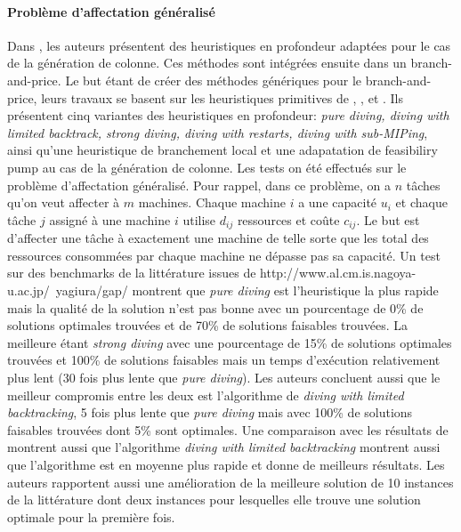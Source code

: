 \documentclass[12pt,a4paper,oneside]{book}
\theoremstyle{definition}
\begin{document}
	    
	    \paragraph{Problème d'affectation généralisé}
	        Dans \cite{sadykov2018primal}, les auteurs présentent des heuristiques en profondeur adaptées pour le cas de la génération de colonne. Ces méthodes sont intégrées ensuite dans un branch-and-price. Le but étant de créer des méthodes génériques pour le branch-and-price, leurs travaux se basent sur les heuristiques primitives de \cite{fischetti2003local}, \cite{Fischetti2005}, \cite{danna2005exploring} et \cite{berthold2006}.
	        Ils présentent cinq variantes des heuristiques en profondeur: \textit{pure diving, diving with limited backtrack, strong diving, diving with restarts, diving with sub-MIPing}, ainsi qu'une heuristique de branchement local et une adapatation de feasibiliry pump au cas de la génération de colonne. Les tests on été effectués sur le problème d'affectation généralisé. Pour rappel, dans ce problème, on a $n$ tâches qu'on veut affecter à $m$ machines. Chaque machine $i$ a une capacité $u_i$ et chaque tâche $j$ assigné à une machine $i$ utilise $d_{ij}$ ressources et coûte $c_{ij}$. Le but est d'affecter une tâche à exactement une machine de telle sorte que les total des ressources consommées par chaque machine ne dépasse pas sa capacité. Un test sur des benchmarks de la littérature issues de http://www.al.cm.is.nagoya-u.ac.jp/~yagiura/gap/ montrent que \textit{pure diving} est l'heuristique la plus rapide mais la qualité de la solution n'est pas bonne avec un pourcentage de 0\% de solutions optimales trouvées et de 70\% de solutions faisables trouvées. La meilleure étant \textit{strong diving} avec une pourcentage de 15\% de solutions optimales trouvées et 100\% de solutions faisables mais un temps d'exécution relativement plus lent (30 fois plus lente que \textit{pure diving}). Les auteurs concluent aussi que le meilleur compromis entre les deux est l'algorithme de \textit{diving with limited backtracking}, 5 fois plus lente que \textit{pure diving} mais avec 100\% de solutions faisables trouvées dont 5\% sont optimales. Une comparaison avec les résultats de \cite{Yagiura2006} montrent aussi que l'algorithme \textit{diving with limited backtracking} montrent aussi que l'algorithme est en moyenne plus rapide et donne de meilleurs résultats. Les auteurs rapportent aussi une amélioration de la meilleure solution de 10 instances de la littérature dont deux instances pour lesquelles elle trouve une solution optimale pour la première fois. 
	        
\end{document}
